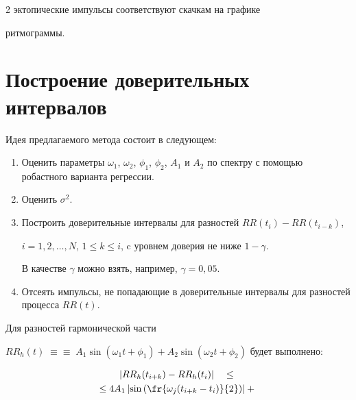 \begin{multicols}{2}
эктопические импульсы соответствуют скачкам на графике


ритмограммы.





\section{Построение доверительных интервалов}%





Идея предлагаемого метода состоит в сле\-ду\-ющем:


\begin{enumerate}[1.]


    \item Оценить параметры $\omega_1$, $\omega_2$, $\phi_1$, $\phi_2$, $A_1$ и $A_2$ по спектру с помощью робастного варианта регрессии.


    \item Оценить $\sigma^2$.\\[-14pt]


    \item Построить доверительные интервалы для разностей $RR(t_i)-RR(t_{i-k})$, 


    $i=1,2,\ldots,N$, $1\leq k\leq i$, c уровнем доверия не ниже $1-\gamma$. 


    В качестве $\gamma$ можно взять, например, $\gamma=0{,}05$.\\[-14pt]


    \item Отсеять импульсы, не попадающие в доверительные интервалы для разностей процесса $RR(t)$.\\[-14pt]


\end{enumerate}





Для разностей гармонической части 


$RR_h(t)\;\equiv$\linebreak $\equiv\;A_1\sin(\omega_1 t + \phi_1) + A_2\sin(\omega_2 t + \phi_2)$ будет выполнено:


\begin{multline}


\label{harmonicdiff}


   \left|RR_h(t_{i+k}) - RR_h(t_i)\right|\quad \leq {}\\


   \leq 4A_1\left|\sin\left(\fr{\omega_j (t_{i+k}-t_i)}{2}\right)\right| + {}\\



\end{multline}
\end{multicols}
